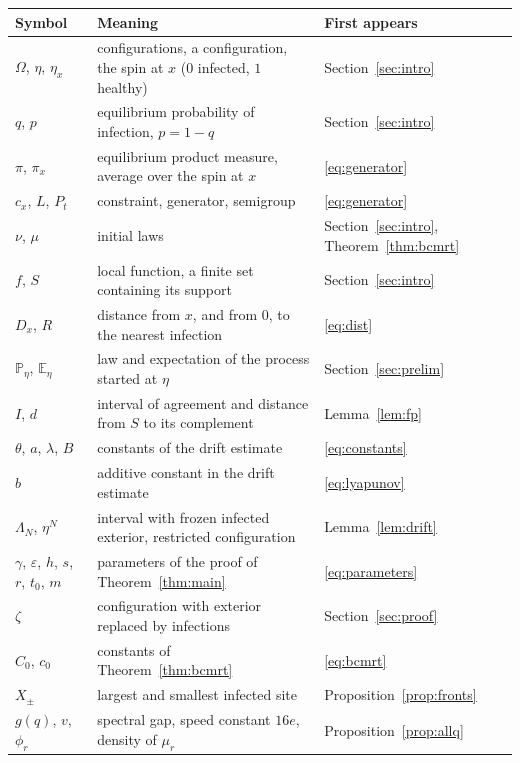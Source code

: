 \documentclass[11pt]{amsart}
\theoremstyle{remark}
\newcommand{\PP}{\mathbb{P}}
\newcommand{\E}{\mathbb{E}}
\begin{document}
\begin{center}
\begin{tabular}{p{3.5cm}p{7.3cm}p{3.3cm}}
\toprule
Symbol & Meaning & First appears\\
\midrule
$\Omega$, $\eta$, $\eta_x$ & configurations, a configuration, the spin at $x$ ($0$ infected, $1$ healthy) & Section~\ref{sec:intro}\\
$q$, $p$ & equilibrium probability of infection, $p=1-q$ & Section~\ref{sec:intro}\\
$\pi$, $\pi_x$ & equilibrium product measure, average over the spin at $x$ & \eqref{eq:generator}\\
$c_x$, $L$, $P_t$ & constraint, generator, semigroup & \eqref{eq:generator}\\
$\nu$, $\mu$ & initial laws & Section~\ref{sec:intro}, Theorem~\ref{thm:bcmrt}\\
$f$, $S$ & local function, a finite set containing its support & Section~\ref{sec:intro}\\
$D_x$, $R$ & distance from $x$, and from $0$, to the nearest infection & \eqref{eq:dist}\\
$\PP_\eta$, $\E_\eta$ & law and expectation of the process started at $\eta$ & Section~\ref{sec:prelim}\\
$I$, $d$ & interval of agreement and distance from $S$ to its complement & Lemma~\ref{lem:fp}\\
$\theta$, $a$, $\lambda$, $B$ & constants of the drift estimate & \eqref{eq:constants}\\
$b$ & additive constant in the drift estimate & \eqref{eq:lyapunov}\\
$\Lambda_N$, $\eta^N$ & interval with frozen infected exterior, restricted configuration & Lemma~\ref{lem:drift}\\
$\gamma$, $\varepsilon$, $h$, $s$, $r$, $t_0$, $m$ & parameters of the proof of Theorem~\ref{thm:main} & \eqref{eq:parameters}\\
$\zeta$ & configuration with exterior replaced by infections & Section~\ref{sec:proof}\\
$C_0$, $c_0$ & constants of Theorem~\ref{thm:bcmrt} & \eqref{eq:bcmrt}\\
$X_\pm$ & largest and smallest infected site & Proposition~\ref{prop:fronts}\\
$g(q)$, $v$, $\phi_r$ & spectral gap, speed constant $16e$, density of $\mu_r$ & Proposition~\ref{prop:allq}\\
\bottomrule
\end{tabular}
\end{center}
\end{document}

